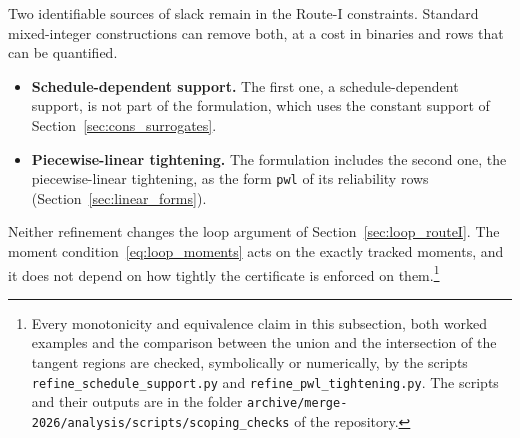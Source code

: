 \documentclass[11pt,a4paper]{article}
\theoremstyle{plain}
\theoremstyle{definition}
\theoremstyle{remark}
\begin{document}
Two identifiable sources of slack remain in the Route-I constraints.
Standard mixed-integer constructions can remove both, at a cost in binaries and rows that can be quantified.
\begin{itemize}
  \item \textbf{Schedule-dependent support.} The first one, a schedule-dependent support, is not part of the formulation, which uses the constant support of Section~\ref{sec:cons_surrogates}.
  \item \textbf{Piecewise-linear tightening.} The formulation includes the second one, the piecewise-linear tightening, as the form \texttt{pwl} of its reliability rows (Section~\ref{sec:linear_forms}).
\end{itemize}
Neither refinement changes the loop argument of Section~\ref{sec:loop_routeI}.
The moment condition~\eqref{eq:loop_moments} acts on the exactly tracked moments, and it does not depend on how tightly the certificate is enforced on them.\footnote{Every monotonicity and equivalence claim in this subsection, both worked examples and the comparison between the union and the intersection of the tangent regions are checked, symbolically or numerically, by the scripts \texttt{refine\_schedule\_support.py} and \texttt{refine\_pwl\_tightening.py}. The scripts and their outputs are in the folder \texttt{archive/merge-2026/analysis/scripts/\allowbreak scoping\_checks} of the repository.}
\end{document}
